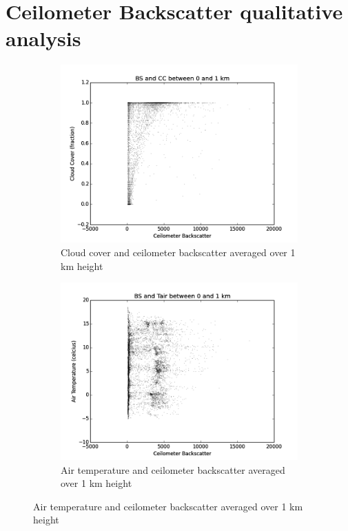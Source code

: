 \documentclass[a4paper,titlepage, twoside]{report}
\begin{document}
\section{Ceilometer Backscatter qualitative analysis}
\begin{figure}
\centering
\begin{subfigure}{0.48\textwidth}
\includegraphics[width=\textwidth]{BS0_CC.png}
\caption{Cloud cover and ceilometer backscatter averaged over 1 km height}
\end{subfigure}
\hfill
\begin{subfigure}{0.48\textwidth}
\includegraphics[width=\textwidth]{BS0_Tair.png}
\caption{Air temperature and ceilometer backscatter averaged over 1 km height}

\end{subfigure}
\end{figure}
\end{document}
